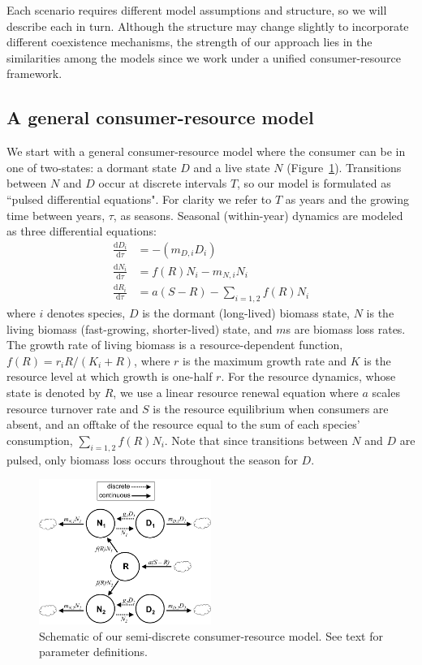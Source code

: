 \documentclass[12pt]{article}
\begin{document}
Each scenario requires different model assumptions and structure, so we will describe each in turn. Although the structure may change slightly to incorporate different coexistence mechanisms, the strength of our approach lies in the similarities among the models since we work under a unified consumer-resource framework.

\subsection{A general consumer-resource model}
We start with a general consumer-resource model where the consumer can be in one of two-states: a dormant state $D$ and a live state $N$ (Figure~\ref{fig:model}). Transitions between $N$ and $D$ occur at discrete intervals $T$, so our model is formulated as ``pulsed differential equations". For clarity we refer to $T$ as years and the growing time between years, $\tau$, as seasons. Seasonal (within-year) dynamics are modeled as three differential equations:
\begin{align}
\frac{\text{d}D_{i}}{\text{d}\tau} &= -(m_{D,i}D_{i})\\
\frac{\text{d}N_{i}}{\text{d}\tau} &= f(R)N_{i} - m_{N,i}N_{i}\\
\frac{\text{d}R_{i}}{\text{d}\tau} &= a(S - R) - \sum\limits_{i=1,2}f(R)N_{i}
\end{align}
where $i$ denotes species, $D$ is the dormant (long-lived) biomass state, $N$ is the living biomass (fast-growing, shorter-lived) state, and $m$s are biomass loss rates. The growth rate of living biomass is a resource-dependent function, $f(R) = r_{i}R/(K_{i}+R)$, where $r$ is the maximum growth rate and $K$ is the resource level at which growth is one-half $r$. For the resource dynamics, whose state is denoted by $R$, we use a linear resource renewal equation where $a$ scales resource turnover rate and $S$ is the resource equilibrium when consumers are absent, and an offtake of the resource equal to the sum of each species' consumption, $\sum_{i=1,2}f(R)N_{i}$. Note that since transitions between $N$ and $D$ are pulsed, only biomass loss occurs throughout the season for $D$.

\begin{figure}
\centering
\includegraphics[width=0.5\textwidth]{"ConceptFig"}
\caption{Schematic of our semi-discrete consumer-resource model. See text for parameter definitions.}
 \label{fig:model}
\end{figure}
\end{document}
